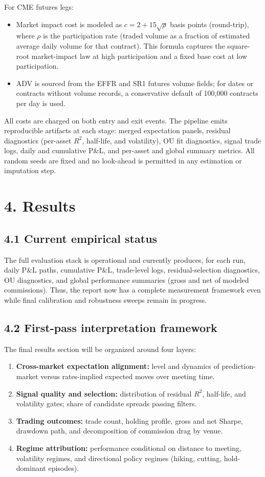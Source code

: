 For CME futures legs:
\begin{itemize}
    \item Market impact cost is modeled as $c = 2 + 15\sqrt{\rho}$ basis points (round-trip), where $\rho$ is the participation rate (traded volume as a fraction of estimated average daily volume for that contract). This formula captures the square-root market-impact law at high participation and a fixed base cost at low participation.
    \item ADV is sourced from the EFFR and SR1 futures volume fields; for dates or contracts without volume records, a conservative default of 100,000 contracts per day is used.
\end{itemize}

All costs are charged on both entry and exit events. The pipeline emits reproducible artifacts at each stage: merged expectation panels, residual diagnostics (per-asset $R^2$, half-life, and volatility), OU fit diagnostics, signal trade logs, daily and cumulative P\&L, and per-asset and global summary metrics. All random seeds are fixed and no look-ahead is permitted in any estimation or imputation step.


\section*{4. Results}

\subsection*{4.1 Current empirical status}

The full evaluation stack is operational and currently produces, for each run, daily P\&L paths, cumulative P\&L, trade-level logs, residual-selection diagnostics, OU diagnostics, and global performance summaries (gross and net of modeled commissions). Thus, the report now has a complete measurement framework even while final calibration and robustness sweeps remain in progress.

\subsection*{4.2 First-pass interpretation framework}

The final results section will be organized around four layers:
\begin{enumerate}
    \item \textbf{Cross-market expectation alignment:} level and dynamics of prediction-market versus rates-implied expected moves over meeting time.
    \item \textbf{Signal quality and selection:} distribution of residual $R^2$, half-life, and volatility gates; share of candidate spreads passing filters.
    \item \textbf{Trading outcomes:} trade count, holding profile, gross and net Sharpe, drawdown path, and decomposition of commission drag by venue.
    \item \textbf{Regime attribution:} performance conditional on distance to meeting, volatility regimes, and directional policy regimes (hiking, cutting, hold-dominant episodes).
\end{enumerate}


